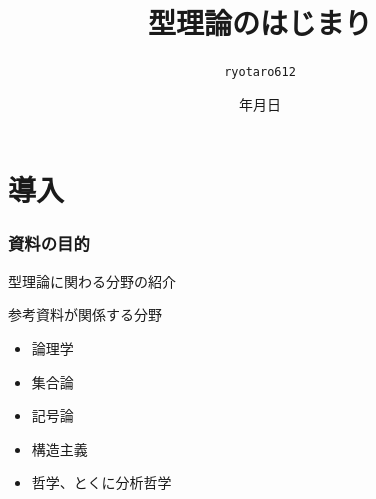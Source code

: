 \documentclass[unicode, 14pt, aspectratio=169]{beamer}
\date{\number\year 年\number\month 月\number\day 日}
\title{型理論のはじまり}
\author{\texttt{ryotaro612}}
\begin{document}
\begin{frame}
\titlepage
\end{frame}
\section{導入}
\begin{frame}
  \frametitle{資料の目的}
  {\large 型理論に関わる分野の紹介}
  \par
  \vspace{16pt}
  参考資料が関係する分野
  \begin{itemize}
  \item 論理学
  \item 集合論
  \item 記号論
  \item 構造主義
  \item 哲学、とくに分析哲学
  \end{itemize}
\end{frame}
\end{document}
